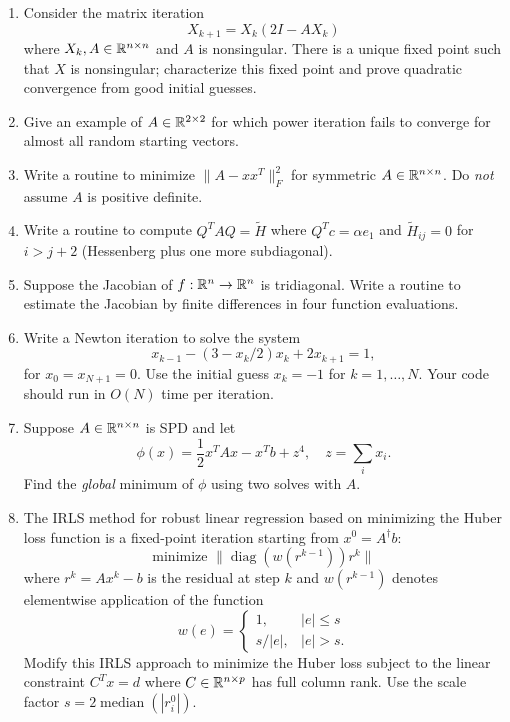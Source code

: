 \documentclass[12pt, leqno]{article}
\begin{document}
\begin{enumerate}
\item
  Consider the matrix iteration
  \[
    X_{k+1} = X_k (2I-A X_k)
  \]
  where $X_k, A \in \mathbb{R}^{n \times n}$ and $A$ is nonsingular.  
  There is a unique
  fixed point such that $X$ is nonsingular; characterize this
  fixed point and prove quadratic convergence from good initial
  guesses.

\item
  Give an example of $A \in \mathbb{R}^{2 \times 2}$ for which power iteration fails
  to converge for almost all random starting vectors.

\item
  Write a routine to minimize $\|A-xx^T\|_F^2$ for symmetric
  $A \in \mathbb{R}^{n \times n}$.
  Do {\em not} assume $A$ is positive definite.

\item
  Write a routine to compute $Q^T A Q = \tilde{H}$ where
  $Q^T c = \alpha e_1$ and $\tilde{H}_{ij} = 0$ for $i > j+2$
  (Hessenberg plus one more subdiagonal).

\item
  Suppose the Jacobian of $f : \mathbb{R}^n \rightarrow \mathbb{R}^n$ is
  tridiagonal.  Write a routine to estimate the Jacobian by
  finite differences in four function evaluations.

\item
  Write a Newton iteration to solve the system
  \[
    x_{k-1} - (3-x_k/2) x_k + 2 x_{k+1} = 1,
  \]
  for $x_0 = x_{N+1} = 0$.  Use the initial guess $x_k = -1$ for $k=1,
  \ldots, N$.  Your code should run in $O(N)$ time per iteration.

\item
  Suppose $A \in \mathbb{R}^{n \times n}$ is SPD and let
  \[
    \phi(x) = \frac{1}{2} x^T A x - x^T b + z^4, \quad
    z = \sum_i x_i.
  \]
  Find the {\em global} minimum of $\phi$ using two solves with $A$.

\item
  The IRLS method for robust linear regression based on minimizing the
  Huber loss function is a fixed-point iteration starting from
  $x^0 = A^\dagger b$:
  \[
    \mbox{minimize } \|\operatorname{diag}(w(r^{k-1})) r^k\|
  \]
  where $r^k = Ax^k-b$ is the residual at step $k$ and $w(r^{k-1})$
  denotes elementwise application of the function
  \[
    w(e) = \begin{cases} 1, & |e| \leq s \\ s/|e|, & |e| > s. \end{cases}
  \]
  Modify this IRLS approach to minimize the Huber loss subject to the
  linear constraint $C^T x = d$ where $C \in \mathbb{R}^{n \times p}$ has
  full column rank.  Use the scale factor
  $s = 2 \operatorname{median}(|r_i^0|)$.
    
\end{enumerate}
\end{document}
